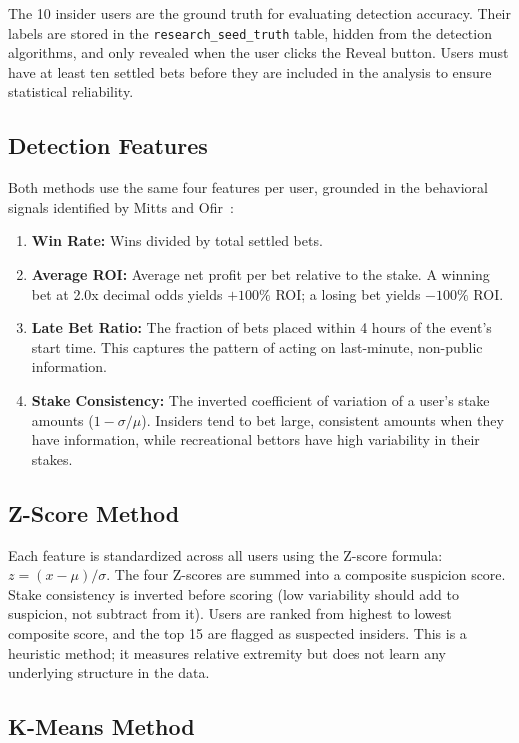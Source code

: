 \documentclass[sigconf,nonacm]{acmart}
\begin{document}
The 10 insider users are the ground truth for evaluating detection
accuracy. Their labels are stored in the
\texttt{research\_seed\_truth} table, hidden from the detection
algorithms, and only revealed when the user clicks the Reveal button.
Users must have at least ten settled bets before they are included in
the analysis to ensure statistical reliability.

\subsection{Detection Features}

Both methods use the same four features per user, grounded in the
behavioral signals identified by Mitts and Ofir~\cite{mitts2025iran}:

\begin{enumerate}
  \item \textbf{Win Rate:} Wins divided by total settled bets.
  \item \textbf{Average ROI:} Average net profit per bet relative to
  the stake. A winning bet at 2.0x decimal odds yields $+100\%$ ROI;
  a losing bet yields $-100\%$ ROI.
  \item \textbf{Late Bet Ratio:} The fraction of bets placed within
  4 hours of the event's start time. This captures the pattern of
  acting on last-minute, non-public information.
  \item \textbf{Stake Consistency:} The inverted coefficient of
  variation of a user's stake amounts ($1 - \sigma/\mu$). Insiders
  tend to bet large, consistent amounts when they have information,
  while recreational bettors have high variability in their stakes.
\end{enumerate}

\subsection{Z-Score Method}

Each feature is standardized across all users using the Z-score
formula: $z = (x - \mu) / \sigma$. The four Z-scores are summed into
a composite suspicion score. Stake consistency is inverted before
scoring (low variability should add to suspicion, not subtract from
it). Users are ranked from highest to lowest composite score, and the
top 15 are flagged as suspected insiders. This is a heuristic
method; it measures relative extremity but does not learn any
underlying structure in the data.

\subsection{K-Means Method}
\end{document}
